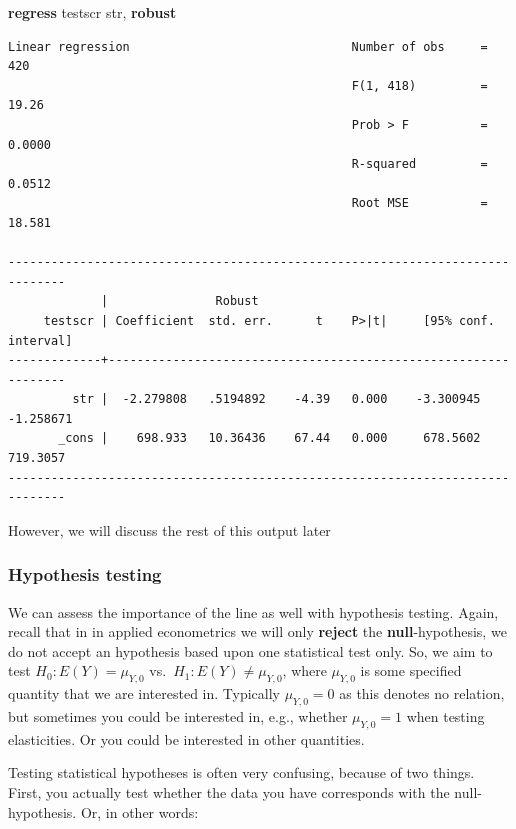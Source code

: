 \documentclass[
]{book}
\newenvironment{Shaded}{\begin{snugshade}}{\end{snugshade}}
\newcommand{\KeywordTok}[1]{\textcolor[rgb]{0.13,0.29,0.53}{\textbf{#1}}}
\newcommand{\NormalTok}[1]{#1}
\begin{document}
\begin{Shaded}
\begin{Highlighting}[]
\KeywordTok{regress}\NormalTok{ testscr str, }\KeywordTok{robust}
\end{Highlighting}
\end{Shaded}

\begin{verbatim}
Linear regression                               Number of obs     =        420
                                                F(1, 418)         =      19.26
                                                Prob > F          =     0.0000
                                                R-squared         =     0.0512
                                                Root MSE          =     18.581

------------------------------------------------------------------------------
             |               Robust
     testscr | Coefficient  std. err.      t    P>|t|     [95% conf. interval]
-------------+----------------------------------------------------------------
         str |  -2.279808   .5194892    -4.39   0.000    -3.300945   -1.258671
       _cons |    698.933   10.36436    67.44   0.000     678.5602    719.3057
------------------------------------------------------------------------------
\end{verbatim}

However, we will discuss the rest of this output later

\hypertarget{hypothesis-testing-1}{%
\subsubsection{Hypothesis testing}\label{hypothesis-testing-1}}

We can assess the importance of the line as well with hypothesis testing. Again, recall that in in applied econometrics we will only \textbf{reject} the \textbf{null}-hypothesis, we do not accept an hypothesis based upon one statistical test only. So, we aim to test \(H_0: E(Y) = \mu_{Y,0}\) vs.~\(H_1: E(Y) \neq \mu_{Y,0}\), where \(\mu_{Y,0}\) is some specified quantity that we are interested in. Typically \(\mu_{Y,0} = 0\) as this denotes no relation, but sometimes you could be interested in, e.g., whether \(\mu_{Y,0} = 1\) when testing elasticities. Or you could be interested in other quantities.

Testing statistical hypotheses is often very confusing, because of two things. First, you actually test whether the data you have corresponds with the null-hypothesis. Or, in other words:
\end{document}
